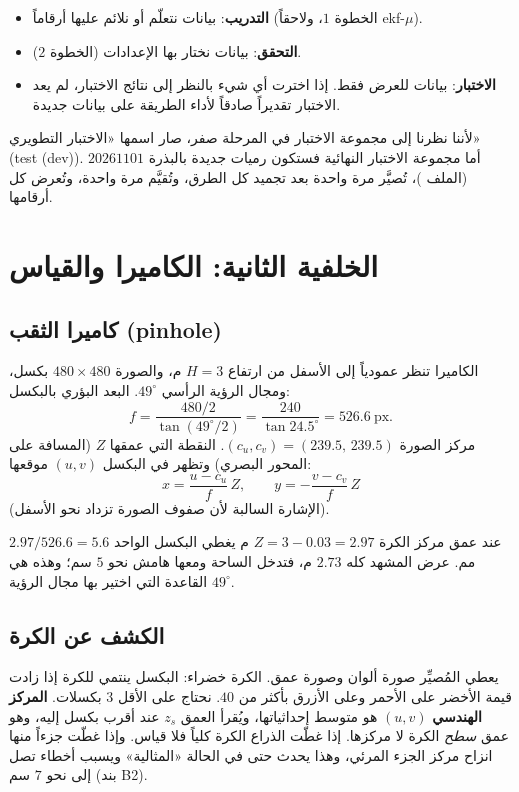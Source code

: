 \documentclass[11pt,a4paper]{article}
\newcommand{\en}[1]{\textenglish{#1}}
\newcommand{\code}[1]{\LR{\texttt{#1}}}
\begin{document}
\begin{idea}
\begin{itemize}
\item \textbf{التدريب}: بيانات نتعلّم أو نلائم عليها أرقاماً (الخطوة $1$، ولاحقاً \en{ekf-$\mu$}).
\item \textbf{التحقق}: بيانات نختار بها الإعدادات (الخطوة $2$).
\item \textbf{الاختبار}: بيانات للعرض فقط. إذا اخترت أي شيء بالنظر إلى نتائج الاختبار، لم يعد الاختبار تقديراً صادقاً
لأداء الطريقة على بيانات جديدة.
\end{itemize}
لأننا نظرنا إلى مجموعة الاختبار في المرحلة صفر، صار اسمها «الاختبار التطويري» (\en{test (dev)}). أما مجموعة الاختبار
النهائية فستكون رميات جديدة بالبذرة $20261101$ (الملف \code{final\_test\_plan.json})، تُصيَّر مرة واحدة بعد تجميد كل الطرق،
وتُقيَّم مرة واحدة، وتُعرض كل أرقامها.
\end{idea}

\section{الخلفية الثانية: الكاميرا والقياس}

\subsection{كاميرا الثقب (\en{pinhole})}
الكاميرا تنظر عمودياً إلى الأسفل من ارتفاع $H=3$ م، والصورة $480\times480$ بكسل، ومجال الرؤية الرأسي $49^\circ$.
البعد البؤري بالبكسل:
\[ f=\frac{480/2}{\tan(49^\circ/2)}=\frac{240}{\tan 24.5^\circ}=526.6\ \text{px}. \]
مركز الصورة $(c_u,c_v)=(239.5,\,239.5)$. النقطة التي عمقها $Z$ (المسافة على المحور البصري) وتظهر في البكسل $(u,v)$ موقعها:
\[ x=\frac{u-c_u}{f}\,Z,\qquad y=-\frac{v-c_v}{f}\,Z \]
(الإشارة السالبة لأن صفوف الصورة تزداد نحو الأسفل).

\begin{example}
عند عمق مركز الكرة $Z=3-0.03=2.97$ م يغطي البكسل الواحد $2.97/526.6=5.6$ مم. عرض المشهد كله $2.73$ م، فتدخل الساحة ومعها هامش
نحو $5$ سم؛ وهذه هي القاعدة التي اختير بها مجال الرؤية $49^\circ$.
\end{example}

\subsection{الكشف عن الكرة}
يعطي المُصيِّر صورة ألوان وصورة عمق. الكرة خضراء: البكسل ينتمي للكرة إذا زادت قيمة الأخضر على الأحمر وعلى الأزرق بأكثر من
$40$. نحتاج على الأقل $3$ بكسلات. \textbf{المركز الهندسي} $(u,v)$ هو متوسط إحداثياتها، ويُقرأ العمق $z_s$ عند أقرب بكسل
إليه، وهو عمق \emph{سطح} الكرة لا مركزها.
إذا غطّت الذراع الكرة كلياً فلا قياس. وإذا غطّت جزءاً منها انزاح مركز الجزء المرئي، وهذا يحدث حتى في الحالة
«المثالية» ويسبب أخطاء تصل إلى نحو $7$ سم (بند \en{B2}).
\end{document}
